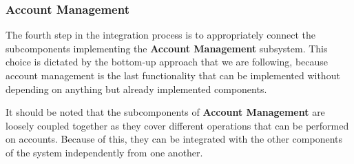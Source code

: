 \subsubsection*{Account Management}
The fourth step in the integration process is to appropriately connect the subcomponents implementing the \textbf{Account Management} subsystem. This choice is dictated by the bottom-up approach that we are following, because account management is the last functionality that can be implemented without depending on anything but already implemented components. 

It should be noted that the subcomponents of \textbf{Account Management} are loosely coupled together as they cover different operations that can be performed on accounts. Because of this, they can be integrated with the other components of the system independently from one another. 

